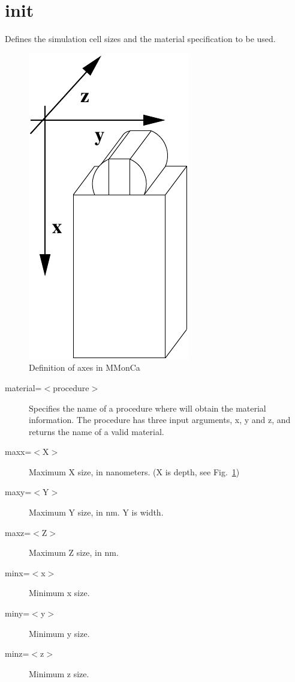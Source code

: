 \section{init}

Defines the simulation cell sizes and the material specification to be used.

\begin{figure}
\begin{center}
\includegraphics{images/axes}
\caption{Definition of axes in MMonCa}
\end{center}
\label{fig:axes}
\end{figure}

\begin{description}
\item [material=$<$procedure$>$] Specifies the name of a procedure where \MMonCa{} will obtain the material information. The procedure has three input arguments, x, y and z, and returns the name of a valid material.
\item [maxx=$<$X$>$] Maximum X size, in nanometers. (X is depth, see Fig.~\ref{fig:axes})
\item [maxy=$<$Y$>$] Maximum Y size, in nm. Y is width.
\item [maxz=$<$Z$>$] Maximum Z size, in nm.
\item [minx=$<$x$>$] Minimum x size.
\item [miny=$<$y$>$] Minimum y size.
\item [minz=$<$z$>$] Minimum z size.
\end{description}

